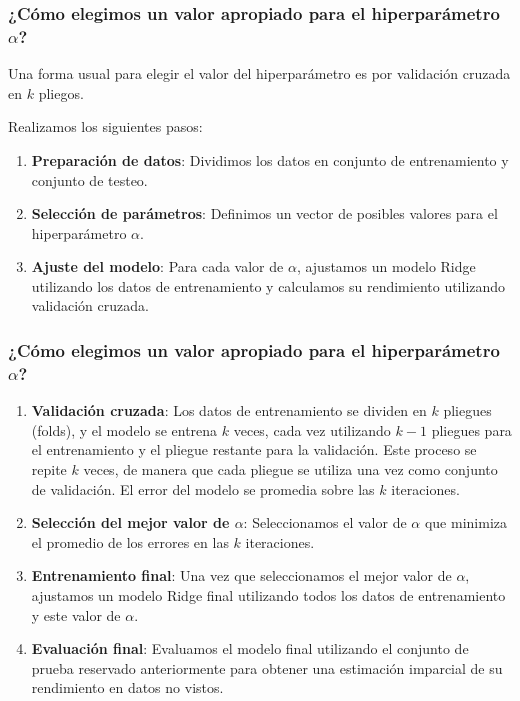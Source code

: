 \documentclass[aspectratio=169,12pt]{beamer}
\begin{document}
\begin{frame}
\frametitle{¿Cómo elegimos un valor apropiado para el hiperparámetro $\alpha$?}

Una forma usual para elegir el valor del hiperparámetro es por validación cruzada en $k$ pliegos.

Realizamos los siguientes pasos:

\begin{enumerate}
\item \textbf{Preparación de datos}: Dividimos los datos en conjunto de entrenamiento y conjunto de testeo. 

\item \textbf{Selección de parámetros}: Definimos un vector de posibles valores para el hiperparámetro $\alpha$. 

\item \textbf{Ajuste del modelo}: Para cada valor de $\alpha$, ajustamos un modelo Ridge utilizando los datos de entrenamiento y calculamos su rendimiento utilizando validación cruzada.
\label{end-enumerate}%
\end{enumerate}
\end{frame}

\begin{frame}
\frametitle{¿Cómo elegimos un valor apropiado para el hiperparámetro $\alpha$?}

\begin{enumerate}
\item \textbf{Validación cruzada}: Los datos de entrenamiento se dividen en $k$ pliegues (folds), y el modelo se entrena $k$ veces, cada vez utilizando $k-1$ pliegues para el entrenamiento y el pliegue restante para la validación. Este proceso se repite $k$ veces, de manera que cada pliegue se utiliza una vez como conjunto de validación. El error del modelo se promedia sobre las $k$ iteraciones.

\item \textbf{Selección del mejor valor de $\alpha$}: Seleccionamos el valor de $\alpha$ que minimiza el promedio de los errores en las $k$ iteraciones. 
    
\item \textbf{Entrenamiento final}: Una vez que seleccionamos el mejor valor de $\alpha$, ajustamos un modelo Ridge final utilizando todos los datos de entrenamiento y este valor de $\alpha$.

\item \textbf{Evaluación final}: Evaluamos el modelo final utilizando el conjunto de prueba reservado anteriormente para obtener una estimación imparcial de su rendimiento en datos no vistos.
\end{enumerate}
\end{frame}
\end{document}
